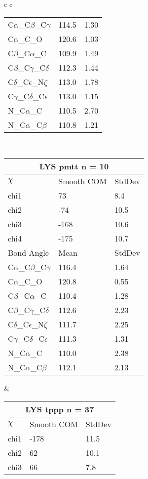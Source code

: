 \begin{longtable}{ c c }
\begin{tabular}{ l l l }
  C$\alpha$\_C$\beta$\_C$\gamma$ & 114.5 & 1.30\\
  C$\alpha$\_C\_O & 120.6 & 1.03\\
  C$\beta$\_C$\alpha$\_C & 109.9 & 1.49\\
  C$\beta$\_C$\gamma$\_C$\delta$ & 112.3 & 1.44\\
  C$\delta$\_C$\epsilon$\_N$\zeta$ & 113.0 & 1.78\\
  C$\gamma$\_C$\delta$\_C$\epsilon$ & 113.0 & 1.15\\
  N\_C$\alpha$\_C & 110.5 & 2.70\\
  N\_C$\alpha$\_C$\beta$ & 110.8 & 1.21\\
  \bottomrule
  \end{tabular}
  \\
  \begin{tabular}{ l l l }
  \toprule
  \multicolumn{3}{c}{LYS \textbf{pmtt} n = 10} \\ \toprule
  $\chi$       & Smooth COM & StdDev \\ \midrule
  chi1 & 73 & 8.4 \\ 
  chi2 & -74 & 10.5 \\ 
  chi3 & -168 & 10.6 \\ 
  chi4 & -175 & 10.7 \\ \midrule
  Bond Angle   & Mean     & StdDev \\ \midrule
  C$\alpha$\_C$\beta$\_C$\gamma$ & 116.4 & 1.64\\
  C$\alpha$\_C\_O & 120.8 & 0.55\\
  C$\beta$\_C$\alpha$\_C & 110.4 & 1.28\\
  C$\beta$\_C$\gamma$\_C$\delta$ & 112.6 & 2.23\\
  C$\delta$\_C$\epsilon$\_N$\zeta$ & 111.7 & 2.25\\
  C$\gamma$\_C$\delta$\_C$\epsilon$ & 111.3 & 1.31\\
  N\_C$\alpha$\_C & 110.0 & 2.38\\
  N\_C$\alpha$\_C$\beta$ & 112.1 & 2.13\\
  \bottomrule
  \end{tabular}
  &
  \begin{tabular}{ l l l }
  \toprule
  \multicolumn{3}{c}{LYS \textbf{tppp} n = 37} \\ \toprule
  $\chi$       & Smooth COM & StdDev \\ \midrule
  chi1 & -178 & 11.5 \\ 
  chi2 & 62 & 10.1 \\ 
  chi3 & 66 & 7.8 \\ 

\end{tabular}
\end{longtable}
